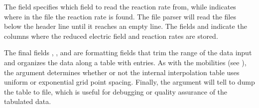 \documentclass[letterpaper,10pt,english]{sphinxmanual}
\begin{document}
\begin{sphinxVerbatim}[commandchars=\\\{\},formatcom=\scriptsize]
  \PYG{p}{[}
       
       
       
       
       
       
       
       
       
       
       
       
  \PYG{p}{]}
\end{sphinxVerbatim}

\sphinxAtStartPar
The  field specifies which field to read the reaction rate from, while  indicates where in the file the reaction rate is found.
The file parser will read the files below the header line until it reaches an empty line.
The fields  and  indicate the columns where the reduced electric field and reaction rates are stored.

\sphinxAtStartPar
The final fields , , and  are formatting fields that trim the range of the data input and organizes the data along a table with  entries.
As with the mobilities (see ), the  argument determines whether or not the internal interpolation table uses uniform or exponential grid point spacing.
Finally, the  argument will tell  to dump the table to file, which is useful for debugging or quality assurance of the tabulated data.
\end{document}
